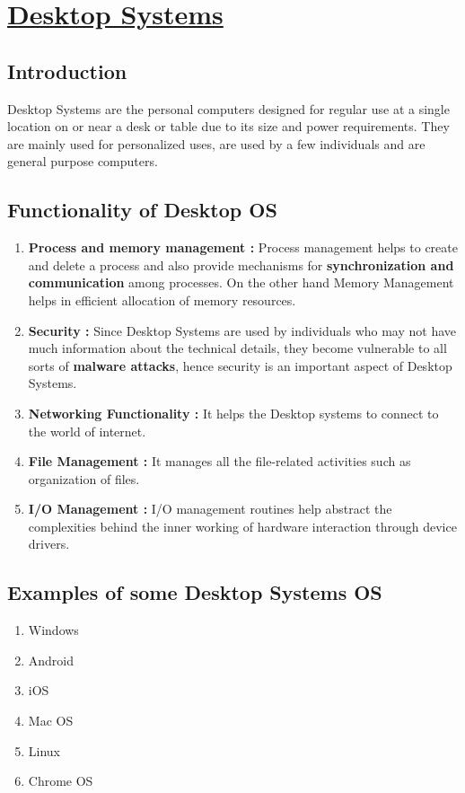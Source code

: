 \documentclass{article}
\begin{document}
    \section{\underline{Desktop Systems}}  
    \subsection{Introduction}
     Desktop Systems are the personal computers designed for regular use at a single location on or near a desk or table due to its size and power requirements. They are mainly used for personalized uses, are used by a few individuals and are general purpose computers.
    \subsection{Functionality of Desktop OS}
    \begin{enumerate}
        \item \textbf{Process and memory management :} Process management helps to create and delete a process and also provide mechanisms for \textbf{synchronization and communication} among processes. On the other hand Memory Management helps in efficient allocation of memory resources.
        
        \item \textbf{Security :} Since Desktop Systems are used by individuals who may not have much information about the technical details, they become vulnerable to all sorts of \textbf{malware attacks}, hence security is an important aspect of Desktop Systems.
        
        \item \textbf{Networking Functionality :} It helps the Desktop systems to connect to the world of internet.
        
        \item \textbf{File Management :} It manages all the file-related activities such as organization  of files.
        
        \item \textbf{I/O Management :} I/O management routines help abstract the complexities behind the inner working of hardware interaction through device drivers. 
    \end{enumerate}
    \subsection{Examples of some Desktop Systems OS}
     \begin{enumerate}
         \item Windows
         \item Android 
         \item iOS
         \item Mac OS
         \item Linux
         \item Chrome OS
     \end{enumerate}
\end{document}
